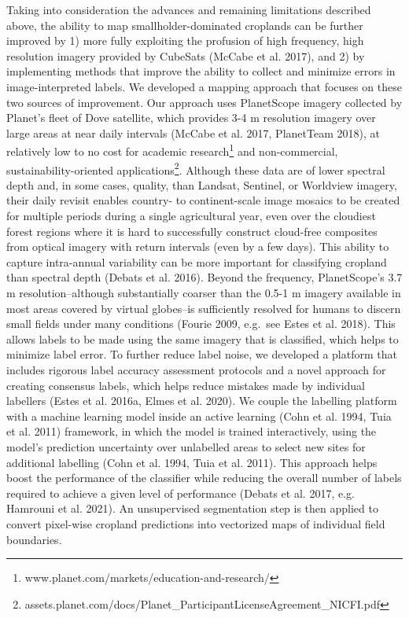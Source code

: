 \documentclass[11pt,a4paper]{article}
\begin{document}
Taking into consideration the advances and remaining limitations
described above, the ability to map smallholder-dominated croplands can
be further improved by 1) more fully exploiting the profusion of high
frequency, high resolution imagery provided by CubeSats (McCabe et al.
2017), and 2) by implementing methods that improve the ability to
collect and minimize errors in image-interpreted labels. We developed a
mapping approach that focuses on these two sources of improvement. Our
approach uses PlanetScope imagery collected by Planet's fleet of Dove
satellite, which provides 3-4 m resolution imagery over large areas at
near daily intervals (McCabe et al. 2017, PlanetTeam 2018), at
relatively low to no cost for academic
research\footnote{www.planet.com/markets/education-and-research/} and
non-commercial, sustainability-oriented
applications\footnote{assets.planet.com/docs/Planet\_ParticipantLicenseAgreement\_NICFI.pdf}.
Although these data are of lower spectral depth and, in some cases,
quality, than Landsat, Sentinel, or Worldview imagery, their daily
revisit enables country- to continent-scale image mosaics to be created
for multiple periods during a single agricultural year, even over the
cloudiest forest regions where it is hard to successfully construct
cloud-free composites from optical imagery with return intervals (even
by a few days). This ability to capture intra-annual variability can be
more important for classifying cropland than spectral depth (Debats et
al. 2016). Beyond the frequency, PlanetScope's 3.7 m
resolution--although substantially coarser than the 0.5-1 m imagery
available in most areas covered by virtual globes--is sufficiently
resolved for humans to discern small fields under many conditions
(Fourie 2009, e.g.~see Estes et al. 2018). This allows labels to be made
using the same imagery that is classified, which helps to minimize label
error. To further reduce label noise, we developed a platform that
includes rigorous label accuracy assessment protocols and a novel
approach for creating consensus labels, which helps reduce mistakes made
by individual labellers (Estes et al. 2016a, Elmes et al. 2020). We
couple the labelling platform with a machine learning model inside an
active learning (Cohn et al. 1994, Tuia et al. 2011) framework, in which
the model is trained interactively, using the model's prediction
uncertainty over unlabelled areas to select new sites for additional
labelling (Cohn et al. 1994, Tuia et al. 2011). This approach helps
boost the performance of the classifier while reducing the overall
number of labels required to achieve a given level of performance
(Debats et al. 2017, e.g. Hamrouni et al. 2021). An unsupervised
segmentation step is then applied to convert pixel-wise cropland
predictions into vectorized maps of individual field boundaries.
\end{document}
